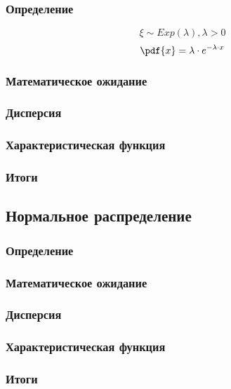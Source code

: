 \subsubsection{Определение}
$$\xi \sim Exp\left( \lambda \right), \lambda>0$$
$$\pdf{x} = \lambda \cdot e^{-\lambda \cdot x}$$
\subsubsection{Математическое ожидание}
\subsubsection{Дисперсия}
\subsubsection{Характеристическая функция}
\subsubsection{Итоги}

\subsection{Нормальное распределение}
\subsubsection{Определение}
\subsubsection{Математическое ожидание}
\subsubsection{Дисперсия}
\subsubsection{Характеристическая функция}
\subsubsection{Итоги}

